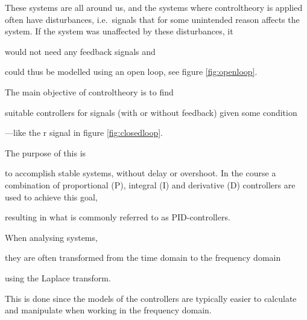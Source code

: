 \begin{modtext}
These systems are all around us, and the systems where \gls{controltheory} is applied often have disturbances, i.e.~signals that for some unintended reason affects the system. 
If the system was unaffected by these disturbances, it 
\end{modtext} 
would not need any feedback signals and \begin{modtext}
could thus be modelled using an open loop, see figure \ref{fig:openloop}.
\end{modtext}
The main objective of \gls{controltheory} is to find 
\begin{modtext}
suitable controllers for signals (with or without feedback) given some condition
\end{modtext}
---like the r signal in figure \ref{fig:closedloop}.
\begin{modtext}
The purpose of this is 
\end{modtext}
to accomplish stable systems, without delay or overshoot. In the course \cite{ERE103} a combination of proportional (P), integral (I) and derivative (D) controllers are used to achieve this goal, \begin{newtext}
resulting in what is commonly referred to as PID-controllers.
\end{newtext} 
\begin{modtext}
When analysing systems, 
\end{modtext}
they are often transformed from the time domain to the frequency domain
\begin{modtext}
using the Laplace transform.
\end{modtext}
\begin{newtext}
This is done since the models of the controllers are typically easier to calculate and manipulate when working in the frequency domain.
\end{newtext}